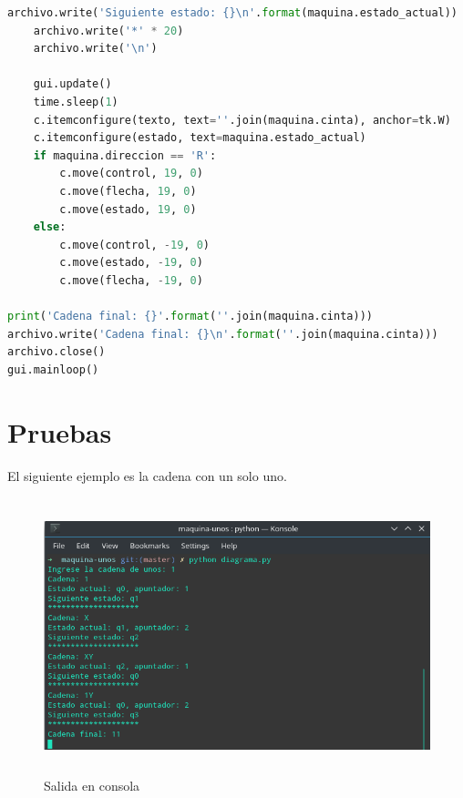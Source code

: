 \documentclass[a4paper,12pt]{article}
\begin{document}
\begin{lstlisting}[language=Python]
    archivo.write('Siguiente estado: {}\n'.format(maquina.estado_actual))
    archivo.write('*' * 20)
    archivo.write('\n')

    gui.update()
    time.sleep(1)
    c.itemconfigure(texto, text=''.join(maquina.cinta), anchor=tk.W)
    c.itemconfigure(estado, text=maquina.estado_actual)
    if maquina.direccion == 'R':
        c.move(control, 19, 0)
        c.move(flecha, 19, 0)
        c.move(estado, 19, 0)
    else:
        c.move(control, -19, 0)
        c.move(estado, -19, 0)
        c.move(flecha, -19, 0)

print('Cadena final: {}'.format(''.join(maquina.cinta)))
archivo.write('Cadena final: {}\n'.format(''.join(maquina.cinta)))
archivo.close()
gui.mainloop()
\end{lstlisting}

\section{Pruebas}
El siguiente ejemplo es la cadena con un solo uno.

\begin{figure}[H]
\begin{center}
 \includegraphics[width=13cm, height=8cm]{uno_consola.png}
 \caption{Salida en consola}
 \label{fig:uno_consola}
\end{center}
\end{figure}
\end{document}
